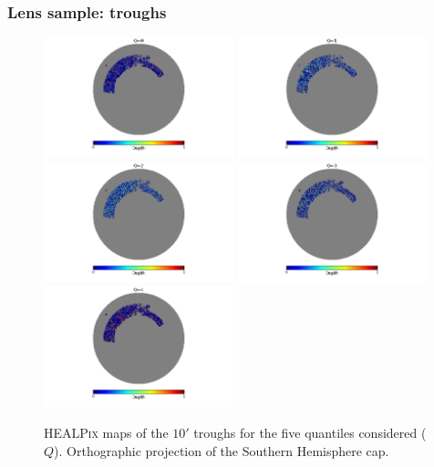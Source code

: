 \subsubsection{Lens sample: troughs}
\begin{figure}
\begin{center}
\includegraphics[width=0.49\textwidth,trim={4cm 0 4cm 0},clip]{./figures_y1/trough_10_q0.png}
\includegraphics[width=0.49\textwidth,trim={4cm 0 4cm 0},clip]{./figures_y1/trough_10_q1.png}\\
\includegraphics[width=0.49\textwidth,trim={4cm 0 4cm 0},clip]{./figures_y1/trough_10_q2.png}
\includegraphics[width=0.49\textwidth,trim={4cm 0 4cm 0},clip]{./figures_y1/trough_10_q3.png}\\
\includegraphics[width=0.49\textwidth,trim={4cm 0 4cm 0},clip]{./figures_y1/trough_10_q4.png}
\end{center}
\caption{{\scshape HEALPix} maps of the $10'$ troughs for the five quantiles considered ($Q$). Orthographic projection of the Southern Hemisphere cap.}
\label{fig:trough_footprint}
\end{figure}

